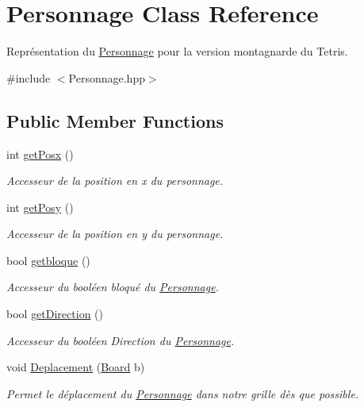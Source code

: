 \hypertarget{classPersonnage}{}\section{Personnage Class Reference}
\label{classPersonnage}


Représentation du \hyperlink{classPersonnage}{Personnage} pour la version montagnarde du Tetris.  




{\ttfamily \#include $<$Personnage.\+hpp$>$}

\subsection*{Public Member Functions}
\begin{DoxyCompactItemize}
\item 
int \hyperlink{classPersonnage_a20df7b440cfc6f6e1b475920aa1d4215}{get\+Posx} ()
\begin{DoxyCompactList}\small\item\em Accesseur de la position en x du personnage. \end{DoxyCompactList}\item 
int \hyperlink{classPersonnage_a37c205046e1f44503e296802b66a74cd}{get\+Posy} ()
\begin{DoxyCompactList}\small\item\em Accesseur de la position en y du personnage. \end{DoxyCompactList}\item 
bool \hyperlink{classPersonnage_a4d5855ca459563583026c13072b72577}{getbloque} ()
\begin{DoxyCompactList}\small\item\em Accesseur du booléen bloqué du \hyperlink{classPersonnage}{Personnage}. \end{DoxyCompactList}\item 
bool \hyperlink{classPersonnage_a943d205f1922133e6154aabc88905ff7}{get\+Direction} ()
\begin{DoxyCompactList}\small\item\em Accesseur du booléen Direction du \hyperlink{classPersonnage}{Personnage}. \end{DoxyCompactList}\item 
void \hyperlink{classPersonnage_a3248e00e7413b2a97a7f198475318d6b}{Deplacement} (\hyperlink{classBoard}{Board} b)
\begin{DoxyCompactList}\small\item\em Permet le déplacement du \hyperlink{classPersonnage}{Personnage} dans notre grille dès que possible. \end{DoxyCompactList}\end{DoxyCompactItemize}


